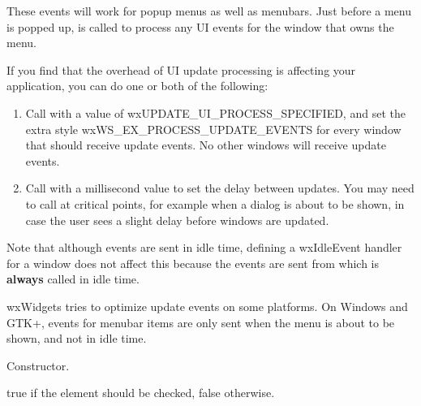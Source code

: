 These events will work for popup menus as well as menubars. Just before a menu is popped
up,  is called to process any UI events for
the window that owns the menu.

If you find that the overhead of UI update processing is affecting
your application, you can do one or both of the following:

\begin{enumerate}
\item Call  with
a value of wxUPDATE\_UI\_PROCESS\_SPECIFIED, and set the extra style
wxWS\_EX\_PROCESS\_UPDATE\_EVENTS for every window that should receive update events.
No other windows will receive update events.
\item Call  with
a millisecond value to set the delay between updates. You may need
to call  at critical
points, for example when a dialog is about to be shown, in case the user
sees a slight delay before windows are updated.
\end{enumerate}

Note that although events are sent in idle time, defining a wxIdleEvent
handler for a window does not affect this because the events are sent from  
which is {\bf always} called in idle time.

wxWidgets tries to optimize update events on some platforms. On Windows
and GTK+, events for menubar items are only sent when the menu is about
to be shown, and not in idle time.




\label{wxupdateuieventctor}


Constructor.

\label{wxupdateuieventmchecked}


true if the element should be checked, false otherwise.

\label{wxupdateuieventmenabled}

